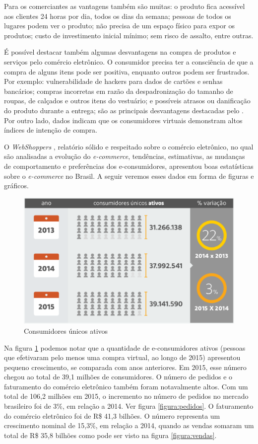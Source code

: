 \documentclass[a4paper,12pt]{monografia}
\begin{document}
Para os comerciantes as vantagens também são muitas: o produto fica acessível aos clientes 24 horas por dia, todos os dias da semana; pessoas de todos os lugares podem ver o produto; não precisa de um espaço físico para expor os produtos; custo de investimento inicial mínimo; sem risco de assalto, entre outras.

É possível destacar também algumas desvantagens na compra de produtos e serviços pelo comércio eletrônico. O consumidor precisa ter a consciência de que a compra de alguns itens pode ser positiva, enquanto outros podem ser frustrados. Por exemplo: vulnerabilidade de hackers para dados de cartões e senhas bancários; compras incorretas em razão da despadronização do tamanho de roupas, de calçados e outros itens do vestuário; e possíveis atrasos ou danificação do produto durante a entrega; são as principais desvantagens destacadas pelo . Por outro lado, dados indicam que os consumidores virtuais demonstram altos índices de intenção de compra.

O \textit{WebShoppers} , relatório sólido e respeitado sobre o comércio eletrônico, no qual são analisadas a evolução do \textit{e-commerce}, tendências, estimativas, as mudanças de comportamento e preferências dos e-consumidores, apresentou boas estatísticas sobre o \textit{e-commerce} no Brasil. A seguir veremos esses dados em forma de figuras e gráficos.

\begin{figure}[H]
\centering
\includegraphics[width=12cm]{img/webshoppers/consumidores.eps}
\caption{Consumidores únicos ativos}
\label{figura:consumidores}
\end{figure}

Na figura \ref{figura:consumidores} podemos notar que a quantidade de e-consumidores ativos (pessoas que efetivaram pelo
menos uma compra virtual, ao longo de 2015) apresentou pequeno crescimento, se comparada com anos anteriores. Em 2015, esse número chegou ao total de 39,1 milhões de consumidores. O número de pedidos e o faturamento do comércio eletrônico também foram notavalmente altos. Com um total de 106,2 milhões em 2015, o incremento no número de pedidos no mercado brasileiro foi de 3\%,
em relação a 2014. Ver figura \ref{figura:pedidos}. O faturamento do comércio eletrônico foi de R\$ 41,3 bilhões. O número representa um crescimento nominal de 15,3\%, em relação a 2014, quando as vendas somaram um total de R\$ 35,8 bilhões como pode ser visto na figura \ref{figura:vendas}.
\end{document}
